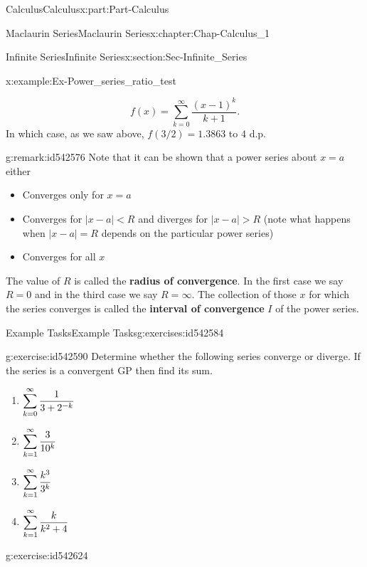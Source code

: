 \documentclass[oneside,10pt,]{book}
\newcommand{\terminology}[1]{\textbf{#1}}
\numberwithin{equation}{section}
\begin{document}
\begin{partptx}{Calculus}{}{Calculus}{}{}{x:part:Part-Calculus}
\begin{chapterptx}{Maclaurin Series}{}{Maclaurin Series}{}{}{x:chapter:Chap-Calculus_1}
\begin{sectionptx}{Infinite Series}{}{Infinite Series}{}{}{x:section:Sec-Infinite_Series}
\begin{example}{}{x:example:Ex-Power_series_ratio_test}
\begin{itemize}[label=\textbullet]
\begin{equation*}
f(x) = \sum_{k=0}^{\infty}\dfrac{(x-1)^k}{k+1}.
\end{equation*}
In which case, as we saw above, \(f(3/2)=1.3863\) to \(4\) d.p.%
\end{itemize}
%
\end{example}
\begin{remark}{}{g:remark:id542576}%
Note that it can be shown that a power series about \(x=a\) either%
\begin{itemize}[label=\textbullet]
\item{}Converges only for \(x=a\)%
\item{}Converges for \(|x-a|<R\) and diverges for \(|x-a|>R\) (note what happens when \(|x-a|=R\) depends on the particular power series)%
\item{}Converges for all \(x\)%
\end{itemize}
The value of \(R\) is called the \terminology{radius of convergence}. In the first case we say \(R=0\) and in the third case we say \(R=\infty\). The collection of those \(x\) for which the series converges is called the \terminology{interval of convergence} \(I\) of the power series.%
\end{remark}
%
%
\typeout{************************************************}
\typeout{************************************************}
%
\begin{exercises-subsection-numberless}{Example Tasks}{}{Example Tasks}{}{}{g:exercises:id542584}
\begin{divisionexercise}{1}{}{}{g:exercise:id542590}%
Determine whether the following series converge or diverge. If the series is a convergent GP then find its sum.%
\begin{multicols}{2}
\begin{enumerate}[label=\alph*]
\item{}\(\displaystyle \displaystyle \sum_{k=0}^{\infty}\dfrac{1}{3+2^{-k}}\)%
\item{}\(\displaystyle \displaystyle \sum_{k=1}^{\infty}\dfrac{3}{10^{k}}\)%
\item{}\(\displaystyle \displaystyle \sum_{k=1}^{\infty}\dfrac{k^3}{3^k}\)%
\item{}\(\displaystyle \displaystyle \sum_{k=1}^{\infty}\dfrac{k}{k^2+4}\)%
\end{enumerate}
\end{multicols}
%
\end{divisionexercise}%
\begin{divisionexercise}{2}{}{}{g:exercise:id542624}%

\end{divisionexercise}
\end{exercises-subsection-numberless}
\end{sectionptx}
\end{chapterptx}
\end{partptx}
\end{document}
